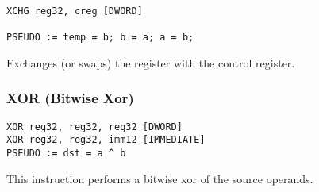 \begin{verbatim}
XCHG reg32, creg [DWORD]

PSEUDO := temp = b; b = a; a = b;
\end{verbatim}


Exchanges (or swaps) the register with the control register.

\subsubsection{XOR (Bitwise Xor)}

\begin{verbatim}
XOR reg32, reg32, reg32 [DWORD]
XOR reg32, reg32, imm12 [IMMEDIATE]
PSEUDO := dst = a ^ b
\end{verbatim}


This instruction performs a bitwise xor of the source operands.
